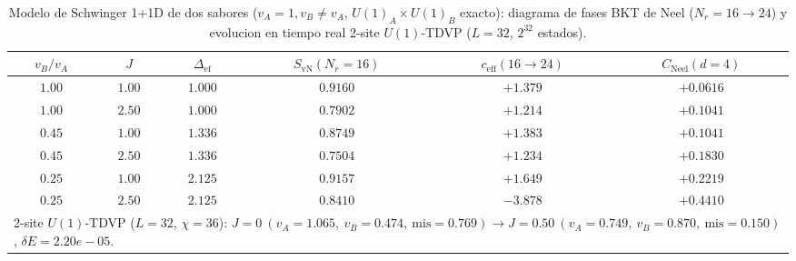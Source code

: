 \begin{table}[t]
\centering
\caption{Modelo de Schwinger 1+1D de dos sabores ($v_A=1, v_B\neq v_A$, $U(1)_A\times U(1)_B$ exacto): diagrama de fases BKT de Neel ($N_r=16\to 24$) y evolucion en tiempo real 2-site $U(1)$-TDVP ($L=32$, $2^{32}$ estados).}
\label{tab:via_c_bkt_tdvp}
\begin{tabular}{cccccc}
\toprule
$v_B / v_A$ & $J$ & $\Delta_{\mathrm{ef}}$ & $S_{\mathrm{vN}}(N_r=16)$ & $c_{\mathrm{eff}}(16\to 24)$ & $C_{\mathrm{Neel}}(d=4)$ \\
\midrule
$1.00$ & $1.00$ & $1.000$ & $0.9160$ & $+1.379$ & $+0.0616$ \\
$1.00$ & $2.50$ & $1.000$ & $0.7902$ & $+1.214$ & $+0.1041$ \\
$0.45$ & $1.00$ & $1.336$ & $0.8749$ & $+1.383$ & $+0.1041$ \\
$0.45$ & $2.50$ & $1.336$ & $0.7504$ & $+1.234$ & $+0.1830$ \\
$0.25$ & $1.00$ & $2.125$ & $0.9157$ & $+1.649$ & $+0.2219$ \\
$0.25$ & $2.50$ & $2.125$ & $0.8410$ & $-3.878$ & $+0.4410$ \\
\midrule
\multicolumn{6}{l}{2-site $U(1)$-TDVP ($L=32$, $\chi=36$): $J=0\ (v_A=1.065,\ v_B=0.474,\ \mathrm{mis}=0.769) \to J=0.50\ (v_A=0.749,\ v_B=0.870,\ \mathrm{mis}=0.150)$, $\delta E=2.20e-05$.} \\
\bottomrule
\end{tabular}
\end{table}
